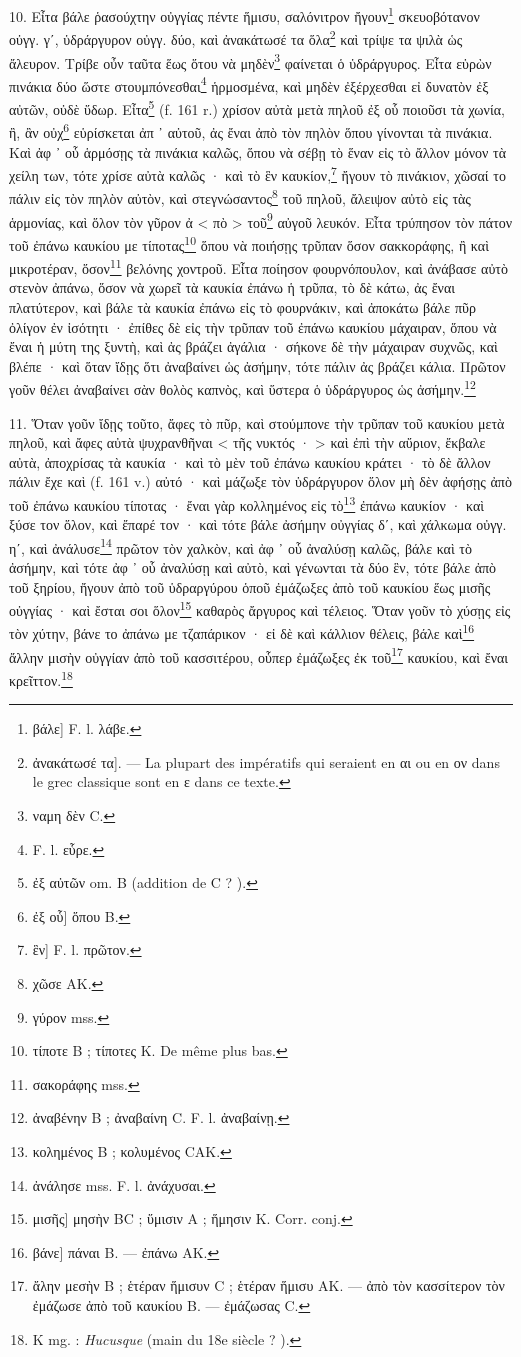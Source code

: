 \documentclass[a4paper, 11pt, oneside, polutonikogreek, french]{article}
\begin{document}
10. Εἶτα βάλε ῥασούχτην οὐγγίας πέντε ἥμισυ, σαλόνιτρον ἤγουν\footnote{βάλε] F. l. λάβε.} σκευοβότανον οὐγγ. γʹ, ὑδράργυρον οὐγγ. δύο, καὶ ἀνακάτωσέ τα ὅλα\footnote{ἀνακάτωσέ τα]. --- La plupart des impératifs qui seraient en αι ou en ον dans le grec classique sont en ε dans ce texte.} καὶ τρίψε τα ψιλὰ ὡς ἄλευρον. Τρίβε οὖν ταῦτα ἕως ὅτου νὰ μηδὲν\footnote{ναμη δὲν C.} φαίνεται ὁ ὑδράργυρος. Εἶτα εὑρὼν πινάκια δύο ὥστε στουμπόνεσθαι\footnote{F. l. εὗρε.} ἡρμοσμένα, καὶ μηδὲν ἐξέρχεσθαι εἰ δυνατὸν ἐξ αὐτῶν, οὐδὲ ὕδωρ. Εἶτα\footnote{ἐξ αὐτῶν om. B (addition de C ? ).} (f. 161 r.) χρίσον αὐτὰ μετὰ πηλοῦ ἐξ οὗ ποιοῦσι τὰ χωνία, ἢ, ἂν οὐχ\footnote{ἐξ οὗ] ὅπου B.} εὑρίσκεται ἀπ ᾽ αὐτοῦ, ἀς ἔναι ἀπὸ τὸν πηλὸν ὅπου γίνονται τὰ πινάκια. Καὶ ἀφ ᾽ οὗ ἁρμόσῃς τὰ πινάκια καλῶς, ὅπου νὰ σέβῃ τὸ ἕναν εἰς τὸ ἄλλον μόνον τὰ χείλη των, τότε χρίσε αὐτὰ καλῶς · καὶ τὸ ἓν καυκίον,\footnote{ἓν] F. l. πρῶτον.} ἤγουν τὸ πινάκιον, χῶσαί το πάλιν εἰς τὸν πηλὸν αὐτὸν, καὶ στεγνώσαντος\footnote{χῶσε AK.} τοῦ πηλοῦ, ἄλειψον αὐτὸ εἰς τὰς ἁρμονίας, καὶ ὅλον τὸν γῦρον ἀ < πὸ > τοῦ\footnote{γύρον mss.} αὐγοῦ λευκόν. Εἶτα τρύπησον τὸν πάτον τοῦ ἐπάνω καυκίου με τίποτας\footnote{τίποτε B ; τίποτες K. De même plus bas.} ὅπου νὰ ποιήσῃς τρῦπαν ὅσον σακκοράφης, ἢ καὶ μικροτέραν, ὅσον\footnote{σακοράφης mss.} βελόνης χοντροῦ. Εἶτα ποίησον φουρνόπουλον, καὶ ἀνάβασε αὐτὸ στενὸν ἀπάνω, ὅσον νὰ χωρεῖ τὰ καυκία ἐπάνω ἡ τρῦπα, τὸ δὲ κάτω, ἀς ἔναι πλατύτερον, καὶ βάλε τὰ καυκία ἐπάνω εἰς τὸ φουρνάκιν, καὶ ἀποκάτω βάλε πῦρ ὀλίγον ἐν ἰσότητι · ἐπίθες δὲ εἰς τὴν τρῦπαν τοῦ ἐπάνω καυκίου μάχαιραν, ὅπου νὰ ἔναι ἡ μύτη της ξυντὴ, καὶ ἀς βράζει ἀγάλια · σήκονε δὲ τὴν μάχαιραν συχνῶς, καὶ βλέπε · καὶ ὅταν ἴδῃς ὅτι ἀναβαίνει ὡς ἀσήμην, τότε πάλιν ἀς βράζει κάλια. Πρῶτον γοῦν θέλει ἀναβαίνει σὰν θολὸς καπνὸς, καὶ ὕστερα ὁ ὑδράργυρος ὡς ἀσήμην.\footnote{ἀναβένην B ; ἀναβαίνη C. F. l. ἀναβαίνῃ.}

11. Ὅταν γοῦν ἴδῃς τοῦτο, ἄφες τὸ πῦρ, καὶ στούμπονε τὴν τρῦπαν τοῦ καυκίου μετὰ πηλοῦ, καὶ ἄφες αὐτὰ ψυχρανθῆναι < τῆς νυκτός · > καὶ ἐπὶ τὴν αὔριον, ἔκβαλε αὐτὰ, ἀποχρίσας τὰ καυκία · καὶ τὸ μὲν τοῦ ἐπάνω καυκίου κράτει · τὸ δὲ ἄλλον πάλιν ἔχε καὶ (f. 161 v.) αὐτό · καὶ μάζωξε τὸν ὑδράργυρον ὅλον μὴ δὲν ἀφήσῃς ἀπὸ τοῦ ἐπάνω καυκίου τίποτας · ἔναι γὰρ κολλημένος εἰς τὸ\footnote{κολημένος B ; κολυμένος CAK.} ἐπάνω καυκίον · καὶ ξύσε τον ὅλον, καὶ ἔπαρέ τον · καὶ τότε βάλε ἀσήμην οὐγγίας δʹ, καὶ χάλκωμα οὐγγ. ηʹ, καὶ ἀνάλυσε\footnote{ἀνάλησε mss. F. l. ἀνάχυσαι.} πρῶτον τὸν χαλκὸν, καὶ ἀφ ᾽ οὗ ἀναλύσῃ καλῶς, βάλε καὶ τὸ ἀσήμην, καὶ τότε ἀφ ᾽ οὗ ἀναλύσῃ καὶ αὐτὸ, καὶ γένωνται τὰ δύο ἓν, τότε βάλε ἀπὸ τοῦ ξηρίου, ἤγουν ἀπὸ τοῦ ὑδραργύρου ὁποῦ ἐμάζωξες ἀπὸ τοῦ καυκίου ἕως μισῆς οὐγγίας · καὶ ἔσται σοι ὅλον\footnote{μισῆς] μησὴν BC ; ὕμισιν A ; ἥμησιν K. Corr. conj.} καθαρὸς ἄργυρος καὶ τέλειος. Ὅταν γοῦν τὸ χύσῃς εἰς τὸν χύτην, βάνε το ἀπάνω με τζαπάρικον · εἰ δὲ καὶ κάλλιον θέλεις, βάλε καὶ\footnote{βάνε] πάναι B. --- ἐπάνω AK.} ἄλλην μισὴν οὐγγίαν ἀπὸ τοῦ κασσιτέρου, οὗπερ ἐμάζωξες ἐκ τοῦ\footnote{ἄλην μεσὴν B ; ἑτέραν ἥμισυν C ; ἑτέραν ἥμισυ AK. --- ἀπὸ τὸν κασσίτερον τὸν ἐμάζωσε ἀπὸ τοῦ καυκίου B. --- ἐμάζωσας C.} καυκίου, καὶ ἔναι κρεῖττον.\footnote{K mg. : \emph{Hucusque} (main du 18e siècle ? ).}
\end{document}
